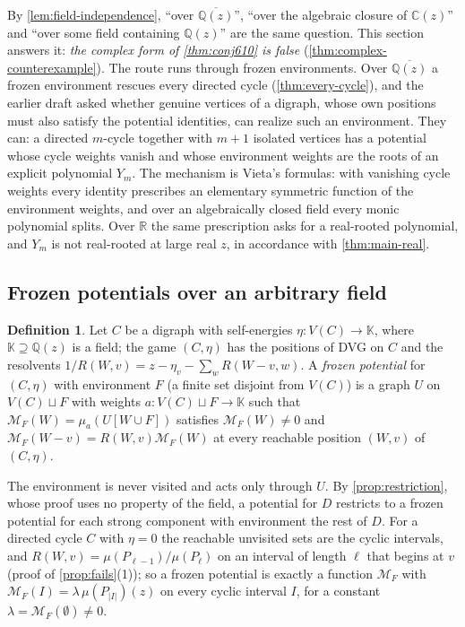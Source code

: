 \documentclass[11pt]{amsart}
\theoremstyle{plain}
\theoremstyle{definition}
\newtheorem{definition}[theorem]{Definition}
\theoremstyle{remark}
\numberwithin{equation}{section}
\newcommand{\QQ}{\mathbb{Q}}
\newcommand{\RR}{\mathbb{R}}
\newcommand{\CC}{\mathbb{C}}
\newcommand{\Qz}{\QQ(z)}
\newcommand{\Qzbar}{\overline{\QQ(z)}}
\newcommand{\Mpot}{\mathcal{M}}           %
\begin{document}
By \cref{lem:field-independence}, ``over $\Qzbar$'', ``over the algebraic closure of $\CC(z)$'' and ``over some field containing $\Qz$'' are the same question. This section answers it: \emph{the complex form of \cref{thm:conj610} is false} (\cref{thm:complex-counterexample}). The route runs through frozen environments. Over $\Qzbar$ a frozen environment rescues every directed cycle (\cref{thm:every-cycle}), and the earlier draft asked whether genuine vertices of a digraph, whose own positions must also satisfy the potential identities, can realize such an environment. They can: a directed $m$-cycle together with $m+1$ isolated vertices has a potential whose cycle weights vanish and whose environment weights are the roots of an explicit polynomial $Y_m$. The mechanism is Vieta's formulas: with vanishing cycle weights every identity prescribes an elementary symmetric function of the environment weights, and over an algebraically closed field every monic polynomial splits. Over $\RR$ the same prescription asks for a real-rooted polynomial, and $Y_m$ is not real-rooted at large real $z$, in accordance with \cref{thm:main-real}.

\subsection{Frozen potentials over an arbitrary field}

\begin{definition}\label{def:frozen}
Let $C$ be a digraph with self-energies $\eta\colon V(C)\to\mathbb K$, where $\mathbb K\supseteq\Qz$ is a field; the game $(C,\eta)$ has the positions of DVG on $C$ and the resolvents $1/R(W,v)=z-\eta_v-\sum_{w}R(W-v,w)$. A \emph{frozen potential} for $(C,\eta)$ with environment $F$ (a finite set disjoint from $V(C)$) is a graph $U$ on $V(C)\sqcup F$ with weights $a\colon V(C)\sqcup F\to\mathbb K$ such that $\Mpot_F(W)=\mu_a(U[W\cup F])$ satisfies $\Mpot_F(W)\neq0$ and $\Mpot_F(W-v)=R(W,v)\Mpot_F(W)$ at every reachable position $(W,v)$ of $(C,\eta)$.
\end{definition}

The environment is never visited and acts only through $U$. By \cref{prop:restriction}, whose proof uses no property of the field, a potential for $D$ restricts to a frozen potential for each strong component with environment the rest of $D$. For a directed cycle $C$ with $\eta=0$ the reachable unvisited sets are the cyclic intervals, and $R(W,v)=\mu(P_{\ell-1})/\mu(P_\ell)$ on an interval of length $\ell$ that begins at $v$ (proof of \cref{prop:fails}(1)); so a frozen potential is exactly a function $\Mpot_F$ with $\Mpot_F(I)=\lambda\,\mu(P_{|I|})(z)$ on every cyclic interval $I$, for a constant $\lambda=\Mpot_F(\emptyset)\neq0$.
\end{document}
